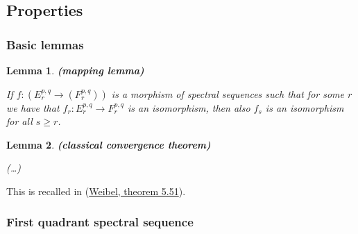 \documentclass[12pt,titlepage]{article}
\theoremstyle{plain}
\newtheorem{lemma}{Lemma}
\theoremstyle{definition}
\theoremstyle{remark}
\begin{document}
\hypertarget{properties}{}\subsection*{{Properties}}\label{properties}

\hypertarget{basic_lemmas}{}\subsubsection*{{Basic lemmas}}\label{basic_lemmas}

\begin{lemma}
\label{mapping_lemma}\hypertarget{}{}
\textbf{(mapping lemma)}

If $f : (E_r^{p,q} \to (F_r^{p,q}))$ is a morphism of spectral sequences such that for some $r$ we have that $f_r : E_r^{p,q} \to F_r^{p,q}$ is an isomorphism, then also $f_s$ is an isomorphism for all $s \geq r$.

\end{lemma}
\begin{lemma}
\label{classical_convergence_theorem}\hypertarget{}{}
\textbf{(classical convergence theorem)}

(\ldots{})

\end{lemma}
This is recalled in (\hyperlink{Weibel}{Weibel, theorem 5.51}).

\hypertarget{FirstQuadrant}{}\subsubsection*{{First quadrant spectral sequence}}\label{FirstQuadrant}
\end{document}
